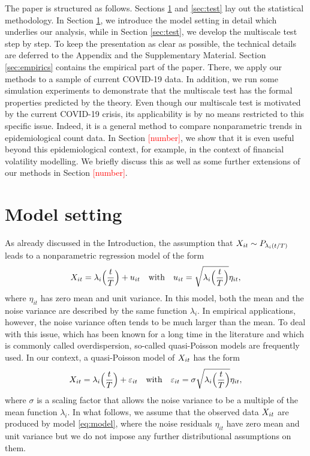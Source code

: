 \documentclass[a4paper,12pt]{article}
\numberwithin{equation}{section}
\begin{document}
The paper is structured as follows. Sections \ref{sec:model} and \ref{sec:test} lay out the statistical methodology. In Section \ref{sec:model}, we introduce the model setting in detail which underlies our analysis, while in Section \ref{sec:test}, we develop the multiscale test step by step. To keep the presentation as clear as possible, the technical details are deferred to the Appendix and the Supplementary Material. Section \ref{sec:empirics} contains the empirical part of the paper. There, we apply our methods to a sample of current COVID-19 data. In addition, we run some simulation experiments to demonstrate that the multiscale test has the formal properties predicted by the theory. Even though our multiscale test is motivated by the current COVID-19 crisis, its applicability is by no means restricted to this specific issue. Indeed, it is a general method to compare nonparametric trends in epidemiological count data. In Section \textcolor{red}{[number]}, we show that it is even useful beyond this epidemiological context, for example, in the context of financial volatility modelling. We briefly discuss this as well as some further extensions of our methods in Section \textcolor{red}{[number]}.



\section{Model setting}\label{sec:model}


As already discussed in the Introduction, the assumption that $X_{it} \sim P_{\lambda_i(t/T)}$ leads to a nonparametric regression model of the form 
\begin{equation}\label{eq:model-Poisson}
X_{it} = \lambda_i\Big(\frac{t}{T}\Big) + u_{it} \quad \text{with} \quad u_{it} = \sqrt{\lambda_i\Big(\frac{t}{T}\Big)} \eta_{it}, 
\end{equation}
where $\eta_{it}$ has zero mean and unit variance. In this model, both the mean and the noise variance are described by the same function $\lambda_i$. In empirical applications, however, the noise variance often tends to be much larger than the mean. To deal with this issue, which has been known for a long time in the literature \citep{Cox1983} and which is commonly called overdispersion, so-called quasi-Poisson models \citep{McCullagh1989, Efron1986} are frequently used. In our context, a quasi-Poisson model of $X_{it}$ has the form 
\begin{equation}\label{eq:model}
X_{it} = \lambda_i\Big(\frac{t}{T}\Big) + \varepsilon_{it} \quad \text{with} \quad \varepsilon_{it} = \sigma \sqrt{\lambda_i\Big(\frac{t}{T}\Big)} \eta_{it}, 
\end{equation}
where $\sigma$ is a scaling factor that allows the noise variance to be a multiple of the mean function $\lambda_i$. In what follows, we assume that the observed data $X_{it}$ are produced by model \eqref{eq:model}, where the noise residuals $\eta_{it}$ have zero mean and unit variance but we do not impose any further distributional assumptions on them.
\end{document}
